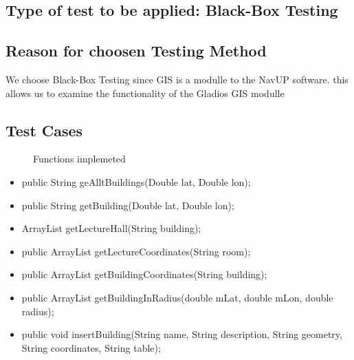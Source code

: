 \documentclass[12pt]{article}
\begin{document}
	\subsection{Type of test to be applied: Black-Box Testing}
		\subsection{Reason for choosen Testing Method }
		We choose Black-Box Testing since GIS is a modulle to the NavUP software. this allows us to examine the functionality of 
		the Gladios GIS modulle


	\subsection{Test Cases}
		\begin{description}
			\item[] Functions implemeted
		\end{description}
	\begin{itemize}
		
		\item{public String geAlltBuildings(Double lat, Double lon);}
		
		
		\item{public String getBuilding(Double lat, Double lon);}
		
		
		\item{ArrayList getLectureHall(String building);}
		
		
		\item{public ArrayList getLectureCoordinates(String room);}
		
		
		\item	{public ArrayList getBuildingCoordinates(String building);   }        
		
		\item{public ArrayList getBuildingInRadius(double mLat, double mLon, double radius);}    
		
		\item {public void insertBuilding(String name, String description, String geometry, String coordinates, String table);}
		
	\end{itemize}
		
\end{document}
